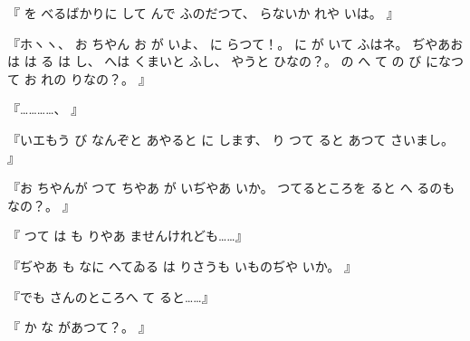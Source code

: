 『
を
べるばかりに
して
んで
ふのだつて、
%
らないか
れや
いは。
』

『ホヽヽ、
%
お
ちやん
お
が
いよ、
%
に
らつて！。
%
に
が
いて
ふはネ。
%
ぢやあお
は
は
る
は
し、
%
へは
くまいと
ふし、
%
やうと
ひなの？。
%
の
へ
て
の
び
になつて
お
れの
りなの？。
』

『…………、
』

『いエもう
び
なんぞと
あやると
に
します、
%
り
つて
ると
あつて
さいまし。
』

『お
ちやんが
つて
ちやあ
が
いぢやあ
いか。
%
つてるところを
ると
へ
るのも
なの？。
』

『
つて
は
も
りやあ
ませんけれども……』

『ぢやあ
も
なに
へてゐる
は
りさうも
いものぢや
いか。
』

『でも
さんのところへ
て
ると……』

『
か
な
があつて？。
』

